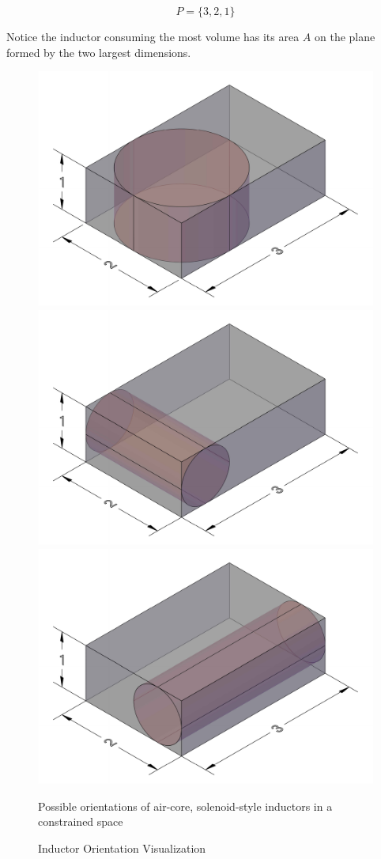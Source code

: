 \documentclass[11pt,oneside]{report}
\begin{document}
    \begin{equation}\label{eq:PrismSimulation}
    P = \{3, 2, 1\} \nonumber
    \end{equation}

    Notice the inductor consuming the most volume has its area $A$ on the plane formed by the two largest dimensions.

    \begin{figure}[!htbp]
        \centering
        \includegraphics[width=0.30\linewidth]{img/xyInductorCropped.pdf}
        \includegraphics[width=0.30\linewidth]{img/xzInductorCropped.pdf}
        \includegraphics[width=0.30\linewidth]{img/yzInductorCropped.pdf}
        \caption{Inductor Orientation Visualization}Possible orientations of air-core, solenoid-style inductors in a constrained space
        \label{fig:PossibleOrientations}
    \end{figure}
    
\end{document}
